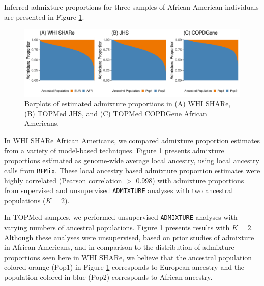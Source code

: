 \documentclass[12pt]{article}
\begin{document}
Inferred admixture proportions for three samples of African American individuals are presented in Figure \ref{fig:barplots}. 

\begin{figure}
\center
\includegraphics[width=\textwidth]{figs/barplots/barplots}
\caption{Barplots of estimated admixture proportions in (A) WHI SHARe, (B) TOPMed JHS, and (C) TOPMed COPDGene African Americans.}
\label{fig:barplots}
\end{figure}

In WHI SHARe African Americans, we compared admixture proportion estimates from a variety of model-based techniques. 
Figure \ref{fig:barplots} presents admixture proportions estimated as genome-wide average local ancestry, using local ancestry calls from \texttt{RFMix}. 
These local ancestry based admixture proportion estimates were highly correlated (Pearson correlation $>$ 0.998) with admixture proportions from supervised and unsupervised \texttt{ADMIXTURE} analyses with two ancestral populations ($K = 2$). 



In TOPMed samples, we performed unsupervised \texttt{ADMIXTURE} analyses with varying numbers of ancestral populations. 
Figure \ref{fig:barplots} presents results with $K = 2$.
Although these analyses were unsupervised, based on prior studies of admixture in African Americans, and in comparison to the distribution of admixture proportions seen here in WHI SHARe, we believe that the ancestral population colored orange (Pop1) in Figure \ref{fig:barplots} corresponds to European ancestry and the population colored in blue (Pop2) corresponds to African ancestry.
\end{document}
